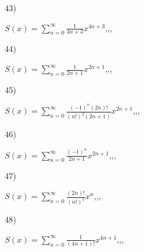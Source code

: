 \documentclass[11pt, ukrainian]{article}
\begin{document}
\par
\vspace{0.9cm}
43) \space 
{%
{$S(x)=\sum\limits_{n=0}^{\infty}{\frac{1}{4n+3}}{x^{{4n+3}}}$},,, \par \smallskip  
}
\par
\vspace{0.9cm}
44) \space 
{%
{$S(x)=\sum\limits_{n=0}^{\infty}{\frac{1}{2n+1}}{x^{{2n+1}}}$},,, \par \smallskip  
}
\par
\vspace{0.9cm}
45) \space 
{%
{$S(x)=\sum\limits_{n=0}^{\infty}{\frac{{(-1)^n}(2n)!}{(n!)^2(2n+1)}}{x^{{2n+1}}}$},,, \par \smallskip  
}
\par
\vspace{0.9cm}
46) \space 
{%
{$S(x)=\sum\limits_{n=0}^{\infty}{\frac{(-1)^{n}}{2n+1}}{x^{{2n+1}}}$},,, \par \smallskip  
}
\par
\vspace{0.9cm}
47) \space 
{%
{$S(x)=\sum\limits_{n=0}^{\infty}{\frac{(2n)!}{(n!)^3}}{x^{{n}}}$},,, \par \smallskip  
}
\par
\vspace{0.9cm}
48) \space 
{%
{$S(x)=\sum\limits_{n=0}^{\infty}{\frac{1}{(4n+1)!}}{x^{{4n+1}}}$},,, \par \smallskip  
}
\end{document}
